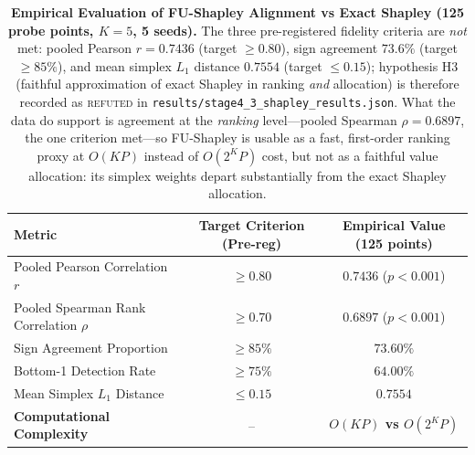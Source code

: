 \begin{table}[t]
\centering
\small
\caption{\textbf{Empirical Evaluation of FU-Shapley Alignment vs Exact Shapley (125 probe points, $K=5$, 5 seeds).} 
The three pre-registered fidelity criteria are \emph{not} met: pooled Pearson $r = 0.7436$ (target $\ge 0.80$), sign agreement $73.6\%$ (target $\ge 85\%$), and mean simplex $L_1$ distance $0.7554$ (target $\le 0.15$); hypothesis H3 (faithful approximation of exact Shapley in ranking \emph{and} allocation) is therefore recorded as \textsc{refuted} in \texttt{results/stage4\_3\_shapley\_results.json}. What the data do support is agreement at the \emph{ranking} level---pooled Spearman $\rho = 0.6897$, the one criterion met---so FU-Shapley is usable as a fast, first-order ranking proxy at $O(KP)$ instead of $O(2^K P)$ cost, but not as a faithful value allocation: its simplex weights depart substantially from the exact Shapley allocation.}
\label{tab:shapley_fidelity}
\begin{tabular}{lcc}
\toprule
\textbf{Metric} & \textbf{Target Criterion (Pre-reg)} & \textbf{Empirical Value (125 points)} \\
\midrule
Pooled Pearson Correlation $r$ & $\ge 0.80$ & $0.7436$ ($p < 0.001$) \\
Pooled Spearman Rank Correlation $\rho$ & $\ge 0.70$ & $0.6897$ ($p < 0.001$) \\
Sign Agreement Proportion & $\ge 85\%$ & $73.60\%$ \\
Bottom-1 Detection Rate & $\ge 75\%$ & $64.00\%$ \\
Mean Simplex $L_1$ Distance & $\le 0.15$ & $0.7554$ \\
\midrule
\textbf{Computational Complexity} & -- & \textbf{$O(KP)$ vs $O(2^K P)$} \\
\bottomrule
\end{tabular}
\end{table}
